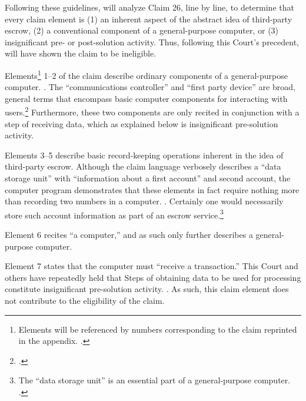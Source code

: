 \documentclass{scotus}
\begin{document}
Following these guidelines, \amici will analyze Claim 26, line by
line, to determine that every claim element is (1) an inherent aspect of the
abstract idea of third-party escrow, (2) a conventional component of a
general-purpose computer, or
(3) insignificant pre- or post-solution activity.
Thus, following this Court's precedent, \amici will have shown the claim to be
ineligible.


Elements\footnote{Elements will be referenced by numbers corresponding to
the claim reprinted in the appendix. .} 1--2 of
the
claim describe ordinary components of a general-purpose computer. . The ``communications controller'' and
``first party device'' are broad, general terms that encompass basic computer
components for interacting with users.\footnote{.} Furthermore,
these two components are only recited in conjunction with a step of receiving
data, which as explained below is insignificant pre-solution activity.

Elements 3--5 describe basic record-keeping operations inherent in the idea of
third-party escrow. Although the claim language verbosely describes a ``data
storage unit'' with ``information about a first account'' and second account,
the computer program demonstrates that these elements in fact
require nothing more than recording two
numbers in a computer. .
Certainly one would necessarily store such account information as part of an
escrow service.\footnote{The ``data storage unit'' is an essential part of a
general-purpose computer. .}

Element 6 recites ``a computer,'' and as such only further describes a
general-purpose computer.

Element 7 states that the computer must ``receive a transaction.'' This Court
and others have repeatedly held that Steps of
obtaining data to be used for processing
constitute insignificant pre-solution activity. . As such,
this
claim element does not contribute to the eligibility of the claim.
\end{document}
